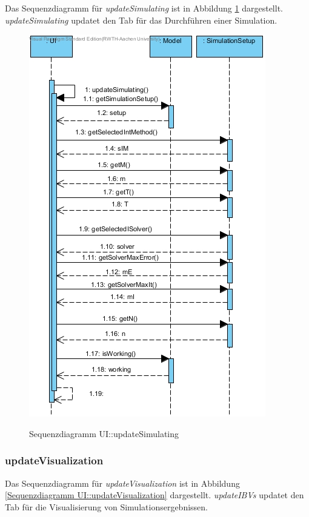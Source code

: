 Das Sequenzdiagramm für \emph{updateSimulating} ist in Abbildung \ref{Sequenzdiagramm UI::updateSimulating} dargestellt. \emph{updateSimulating} updatet den Tab für das Durchführen einer Simulation.

\begin{figure}[H]
	\centering
	\includegraphics[scale=.55]{Bilder/UI__updateSimulating().jpg}\\
	\caption{Sequenzdiagramm UI::updateSimulating}
	\label{Sequenzdiagramm UI::updateSimulating}
\end{figure}

\subsubsection*{updateVisualization}

Das Sequenzdiagramm für \emph{updateVisualization} ist in Abbildung \ref{Sequenzdiagramm UI::updateVisualization} dargestellt. \emph{updateIBVs} updatet den Tab für die Visualisierung von Simulationsergebnissen.

